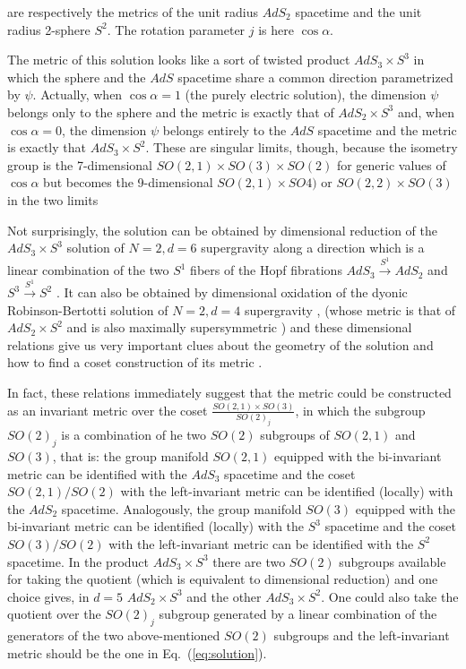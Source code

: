 \documentclass[12pt,a4paper]{article}
\begin{document}
\noindent
are respectively the metrics of the unit radius $AdS_{2}$ spacetime
and the unit radius 2-sphere $S^{2}$. The rotation parameter $j$ is
here $\cos{\alpha}$.

The metric of this solution looks like a sort of twisted product
$AdS_{3}\times S^{3}$ in which the sphere and the $AdS$ spacetime
share a common direction parametrized by $\psi$. Actually, when
$\cos{\alpha}=1$ (the purely electric solution), the dimension $\psi$
belongs only to the sphere and the metric is exactly that of
$AdS_{2}\times S^{3}$ and, when $\cos{\alpha}=0$, the dimension $\psi$
belongs entirely to the $AdS$ spacetime and the metric is exactly that
$AdS_{3}\times S^{2}$. These are singular limits, though, because the
isometry group is the 7-dimensional $SO(2,1)\times SO(3)\times SO(2)$
for generic values of $\cos{\alpha}$ but becomes the 9-dimensional
$SO(2,1)\times SO4)$ or $SO(2,2)\times SO(3)$ in the two limits

Not surprisingly, the solution can be obtained by dimensional
reduction of the $AdS_{3}\times S^{3}$ solution of $N=2,d=6$
supergravity along a direction which is a linear combination of the
two $S^{1}$ fibers of the Hopf fibrations
$AdS_{3}\stackrel{S^{1}}{\rightarrow}AdS_{2}$ and
$S^{3}\stackrel{S^{1}}{\rightarrow}S^{2}$
\cite{Lozano-Tellechea:2002pn}.  It can also be obtained by
dimensional oxidation of the dyonic Robinson-Bertotti solution
\cite{kn:Rob,kn:Bert} of $N=2,d=4$ supergravity
\cite{Lozano-Tellechea:2002pn}, (whose metric is that of
$AdS_{2}\times S^{2}$ and is also maximally supersymmetric
\cite{Gibbons:1984kp,Kallosh:1992gu}) and these dimensional relations
give us very important clues about the geometry of the solution and
how to find a coset construction of its metric \cite{Coquereaux:ne}.

In fact, these relations immediately suggest that the metric could be
constructed as an invariant metric over the coset $\frac{SO(2,1)\times
  SO(3)}{SO(2)_{j}}$, in which the subgroup $SO(2)_{j}$ is a combination of he
two $SO(2)$ subgroups of $SO(2,1)$ and $SO(3)$, that is: the group manifold
$SO(2,1)$ equipped with the bi-invariant metric can be identified with the
$AdS_{3}$ spacetime and the coset $SO(2,1)/SO(2)$ with the left-invariant
metric can be identified (locally) with the $AdS_{2}$ spacetime. Analogously,
the group manifold $SO(3)$ equipped with the bi-invariant metric can be
identified (locally) with the $S^{3}$ spacetime and the coset $SO(3)/SO(2)$
with the left-invariant metric can be identified with the $S^{2}$ spacetime.
In the product $AdS_{3}\times S^{3}$ there are two $SO(2)$ subgroups available
for taking the quotient (which is equivalent to dimensional reduction) and one
choice gives, in $d=5$ $AdS_{2}\times S^{3}$ and the other $AdS_{3}\times
S^{2}$. One could also take the quotient over the $SO(2)_{j}$ subgroup
generated by a linear combination of the generators of the two above-mentioned
$SO(2)$ subgroups and the left-invariant metric should be the one in
Eq.~(\ref{eq:solution}).
\end{document}
